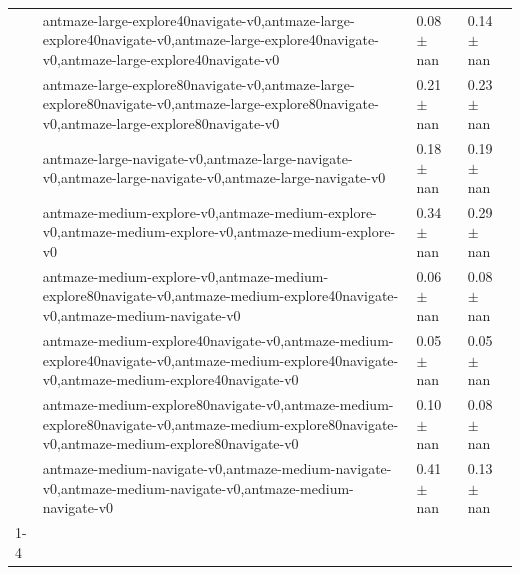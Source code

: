 \begin{tabular}{llll}
 & antmaze-large-explore40navigate-v0,antmaze-large-explore40navigate-v0,antmaze-large-explore40navigate-v0,antmaze-large-explore40navigate-v0 & 0.08 $\pm$ nan & 0.14 $\pm$ nan \\
 & antmaze-large-explore80navigate-v0,antmaze-large-explore80navigate-v0,antmaze-large-explore80navigate-v0,antmaze-large-explore80navigate-v0 & 0.21 $\pm$ nan & 0.23 $\pm$ nan \\
 & antmaze-large-navigate-v0,antmaze-large-navigate-v0,antmaze-large-navigate-v0,antmaze-large-navigate-v0 & 0.18 $\pm$ nan & 0.19 $\pm$ nan \\
 & antmaze-medium-explore-v0,antmaze-medium-explore-v0,antmaze-medium-explore-v0,antmaze-medium-explore-v0 & 0.34 $\pm$ nan & 0.29 $\pm$ nan \\
 & antmaze-medium-explore-v0,antmaze-medium-explore80navigate-v0,antmaze-medium-explore40navigate-v0,antmaze-medium-navigate-v0 & 0.06 $\pm$ nan & 0.08 $\pm$ nan \\
 & antmaze-medium-explore40navigate-v0,antmaze-medium-explore40navigate-v0,antmaze-medium-explore40navigate-v0,antmaze-medium-explore40navigate-v0 & 0.05 $\pm$ nan & 0.05 $\pm$ nan \\
 & antmaze-medium-explore80navigate-v0,antmaze-medium-explore80navigate-v0,antmaze-medium-explore80navigate-v0,antmaze-medium-explore80navigate-v0 & 0.10 $\pm$ nan & 0.08 $\pm$ nan \\
 & antmaze-medium-navigate-v0,antmaze-medium-navigate-v0,antmaze-medium-navigate-v0,antmaze-medium-navigate-v0 & 0.41 $\pm$ nan & 0.13 $\pm$ nan \\
\cline{1-4}
\bottomrule
\end{tabular}
